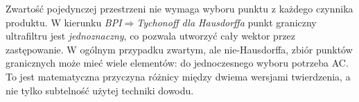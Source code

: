\begin{uwaga}
\label{rem:tychonoff-choice-distinction}
Zwartość pojedynczej przestrzeni nie wymaga wyboru punktu
z każdego czynnika produktu. W kierunku
\emph{BPI$\Rightarrow$Tychonoff dla Hausdorffa} punkt graniczny
ultrafiltru jest \emph{jednoznaczny}, co pozwala utworzyć
cały wektor przez zastępowanie. W ogólnym przypadku
zwartym, ale nie-Hausdorffa, zbiór punktów granicznych
może mieć wiele elementów: do jednoczesnego wyboru
potrzeba AC. To jest matematyczna przyczyna różnicy
między dwiema wersjami twierdzenia, a nie tylko
subtelność użytej techniki dowodu.
\end{uwaga}